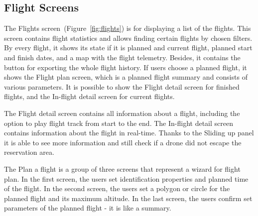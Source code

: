 \subsection{Flight Screens}\label{subsec:flight-screens}
The Flights screen~(Figure~\ref{fig:flights}) is for displaying a list of the flights.
This screen contains flight statistics and allows finding certain flights by chosen filters.
By every flight, it shows its state if it is planned and current flight, planned start and finish dates, and a map with the flight telemetry.
Besides, it contains the button for exporting the whole flight history.
If users choose a planned flight, it shows the Flight plan screen, which is a planned flight summary and consists of various parameters.
It is possible to show the Flight detail screen for finished flights, and the In-flight detail screen for current flights.

The Flight detail screen contains all information about a flight, including the option to play flight track from start to the end.
The In-flight detail screen contains information about the flight in real-time.
Thanks to the Sliding up panel it is able to see more information and still check if a drone did not escape the reservation area.

The Plan a flight is a group of three screens that represent a wizard for flight plan.
In the first screen, the users set identification properties and planned time of the flight.
In the second screen, the users set a polygon or circle for the planned flight and its maximum altitude.
In the last screen, the users confirm set parameters of the planned flight - it is like a summary.


